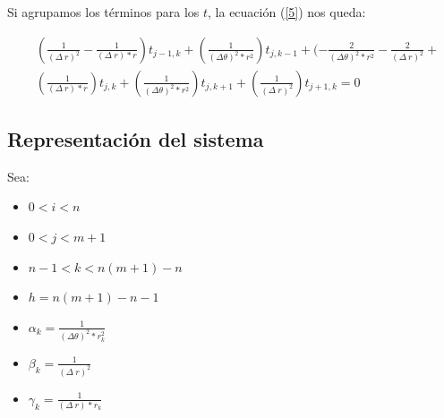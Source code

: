 Si agrupamos los términos para los $t$, la ecuación (\ref{5}) nos queda:

\begin{equation}
   \begin{aligned}
    &(\frac{1}{(\Delta\ r)^2} - \frac{1}{(\Delta\ r) * r})t_{j-1,k} + (\frac{1}{(\Delta\theta)^2 * r^2})t_{j,k-1} +  (-\frac{2}{(\Delta\theta)^2 * r^2}-\frac{2}{(\Delta\ r)^2} +\\
    &(\frac{1} {(\Delta\ r) * r})t_{j,k} + (\frac{1}{(\Delta\theta)^2 * r^2})t_{j,k+1} + (\frac{1}{(\Delta\ r)^2})t_{j+1,k} = 0
    \end{aligned}
\end{equation}

\subsection{Representación del sistema}
Sea:

\begin{itemize}
    \item $0 < i < n$
    \item $0 < j < m+1$
    \item $n-1 < k < n(m+1)-n$
    \item $h = n(m+1)-n-1$
    \item $\alpha_{k} = \frac{1}{(\Delta\theta)^2 * r_{k}^2}$
    \item $\beta_{k} = \frac{1}{(\Delta\ r)^2}$
    \item $\gamma_{k} = \frac{1}{(\Delta\ r) * r_{k}}$
\end{itemize}

